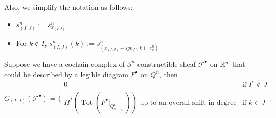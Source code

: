 Also, we simplify the notation as follows:
\begin{itemize}
\item $s^n_{(I,J)}:= s^n_{x_{(I,J)}}$

\item For $k\not\in I$, $s^n_{(I,J)}(k):= s^n_{(x_{(I,J)} - sgn_J(k)\cdot e^n_k)}$ 
\end{itemize}
\begin{lemma}\label{morse}
Suppose we have a cochain complex of $\mathcal{S}^n$-constructible sheaf $\mathscr{F}^\bullet$ on $\mathbb{R}^n$ that could be described by a legible diagram $F^\bullet$ on $Q^n$, then
\[G_{(I,J)}(\mathscr{F}^\bullet)=\bigg\{
\begin{array}{ll}
    0 & \text{if } I^c \not\in J \\
	H^*(\operatorname{Tot}(F^\bullet|_{Q^n_{s_{(I,J)}}}))\text{ up to an overall shift in degree} & \text{if } k\in J \\
\end{array}
\bigg.
\]
\end{lemma}
